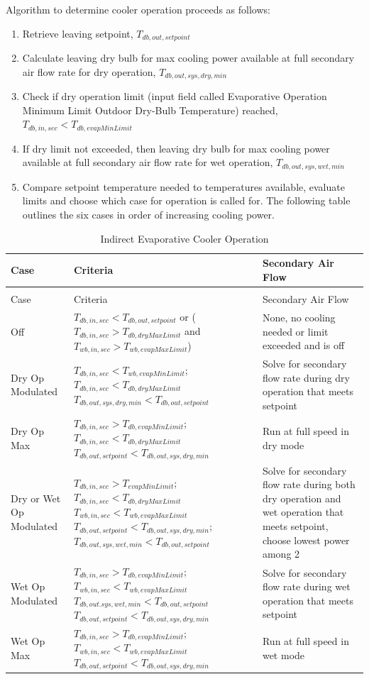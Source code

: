 Algorithm to determine cooler operation proceeds as follows:

\begin{enumerate}
\def\labelenumi{\arabic{enumi}.}
\item
  Retrieve leaving setpoint, \(T_{db,out,setpoint}\)
\item
  Calculate leaving dry bulb for max cooling power available at full secondary air flow rate for dry operation, \(T_{db,out,sys,dry,min}\)
\item
  Check if dry operation limit (input field called Evaporative Operation Minimum Limit Outdoor Dry-Bulb Temperature) reached, \(T_{db,in,sec}<T_{db,evapMinLimit}\)
\item
  If dry limit not exceeded, then leaving dry bulb for max cooling power available at full secondary air flow rate for wet operation, \(T_{db,out,sys,wet,min}\)
\item
  Compare setpoint temperature needed to temperatures available, evaluate limits and choose which case for operation is called for. The following table outlines the six cases in order of increasing cooling power.
\end{enumerate}

\begin{longtable}[c]{@{}lll@{}}
\caption{Indirect Evaporative Cooler Operation \label{table:indirect-evaporative-cooler-operation}} \tabularnewline
\toprule
Case & Criteria & Secondary Air Flow \tabularnewline
\midrule
\endfirsthead

\caption[]{Indirect Evaporative Cooler Operation} \tabularnewline
\toprule
Case & Criteria & Secondary Air Flow \tabularnewline
\midrule
\endhead

Off & \(T_{db,in,sec}<T_{db,out,setpoint}\) or (\(T_{db,in,sec}>T_{db,dryMaxLimit}\) and \(T_{wb,in,sec}>T_{wb,evapMaxLimit}\)) & None, no cooling needed or limit exceeded and is off \tabularnewline
Dry Op Modulated & \(T_{db,in,sec}<T_{wb,evapMinLimit}\); \(T_{db,in,sec}<T_{db,dryMaxLimit}\) \(T_{db,out,sys,dry,min}<T_{db,out,setpoint}\) & Solve for secondary flow rate during dry operation that meets setpoint \tabularnewline
Dry Op Max & \(T_{db,in,sec}>T_{db,evapMinLimit}\); \(T_{db,in,sec}<T_{db,dryMaxLimit}\) \(T_{db,out,setpoint}<T_{db,out,sys,dry,min}\) & Run at full speed in dry mode \tabularnewline
Dry or Wet Op Modulated & \(T_{db,in,sec}>T_{evapMinLimit}\); \(T_{db,in,sec}<T_{db,dryMaxLimit}\) \(T_{wb,in,sec}<T_{wb,evapMaxLimit}\) \(T_{db,out,setpoint}<T_{db,out,sys,dry,min}\); \(T_{db,out,sys,wet,min}<T_{db,out,setpoint}\) & Solve for secondary flow rate during both dry operation and wet operation that meets setpoint, choose lowest power among 2 \tabularnewline
Wet Op Modulated & \(T_{db,in,sec}>T_{db,evapMinLimit}\); \(T_{wb,in,sec}<T_{wb,evapMaxLimit}\) \(T_{db,out.sys,wet,min}<T_{db,out,setpoint}\) \(T_{db,out,setpoint}<T_{db,out,sys,dry,min}\) & Solve for secondary flow rate during wet operation that meets setpoint \tabularnewline
Wet Op Max & \(T_{db,in,sec}>T_{db,evapMinLimit}\); \(T_{wb,in,sec}<T_{wb,evapMaxLimit}\) \(T_{db,out,setpoint}<T_{db,out,sys,dry,min}\) & Run at full speed in wet mode \tabularnewline
\bottomrule
\end{longtable}



